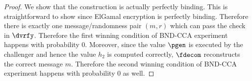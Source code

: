 \begin{proof}
We show that the construction is actually perfectly binding. This is straightforward to show since ElGamal encryption is perfectly binding. Therefore there is exactly one message/randomness pair $(m,r)$ which can pass the check in $\dvrfy$. Therefore the first winning condition of BND-CCA experiment happens with probability 0. Moreover, since the value $\pgen$ is executed by the challenger and hence the value $h_2$ is computed correctly, $\fdecom$ reconstructs the correct message $m$. Therefore the second winning condition of BND-CCA experiment happens with probability 0 as well.
\end{proof}



 

%




